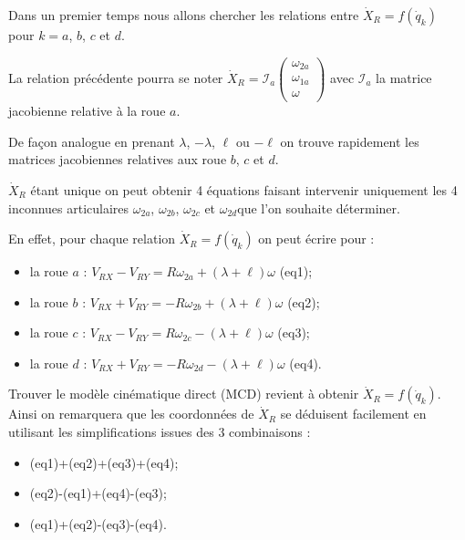Dans un premier temps nous allons chercher les relations entre $\dot{X}_R = f\left(\dot{q}_k \right)$ pour 
$k=a$, $b$, $c$ et $d$.

\ifprof%
\begin{corrige}
\end{corrige}\else\fi

La relation précédente pourra se noter $\dot{X}_R = \mathcal{I}_a \begin{pmatrix}
\omega_{2a} \\ \omega_{1a}\\ \omega_{}\end{pmatrix}$ avec $\mathcal{I}_a$ la matrice jacobienne relative à la roue $a$.

De façon analogue en prenant $\lambda$, $-\lambda$, $\ell$ ou $-\ell$ on trouve rapidement les matrices jacobiennes relatives aux roue $b$, $c$ et $d$.

$\dot{X}_R$ étant unique on peut obtenir 4 équations faisant intervenir uniquement les 4 inconnues articulaires $\omega_{2a}$, $\omega_{2b}$, $\omega_{2c}$ et $\omega_{2d}$que l'on souhaite déterminer.

En effet, pour chaque relation $\dot{X}_R = f\left(\dot{q}_k \right)$ on peut écrire pour :
\begin{itemize}
\item la roue $a$ : $V_{RX}-V_{RY}=R\omega_{2a}+\left(\lambda+\ell\right)\omega$ (eq1);
\item la roue $b$ : $V_{RX}+V_{RY}=-R\omega_{2b}+\left(\lambda+\ell\right)\omega$ (eq2);
\item la roue $c$ : $V_{RX}-V_{RY}=R\omega_{2c}-\left(\lambda+\ell\right)\omega$ (eq3);
\item la roue $d$ : $V_{RX}+V_{RY}=-R\omega_{2d}-\left(\lambda+\ell\right)\omega$ (eq4).
\end{itemize}

Trouver le modèle cinématique direct (MCD) revient à obtenir $\dot{X}_R = f\left(\dot{q}_k \right)$. Ainsi on remarquera que les coordonnées de $\dot{X}_R$ se déduisent facilement en utilisant les simplifications issues des 3 combinaisons :
\begin{itemize}
 \item (eq1)+(eq2)+(eq3)+(eq4);
 \item (eq2)-(eq1)+(eq4)-(eq3);
 \item (eq1)+(eq2)-(eq3)-(eq4).
\end{itemize}

